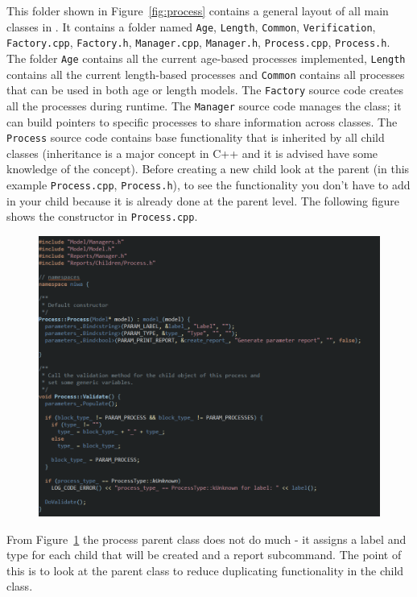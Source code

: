 This folder shown in Figure~\ref{fig:process} contains a general layout of all main classes in \CNAME. It contains a folder named \texttt{Age}, \texttt{Length}, \texttt{Common}, \texttt{Verification}, \texttt{Factory.cpp}, \texttt{Factory.h}, \texttt{Manager.cpp}, \texttt{Manager.h}, \texttt{Process.cpp}, \texttt{Process.h}. The folder \texttt{Age} contains all the current age-based processes implemented, \texttt{Length} contains all the current length-based processes and \texttt{Common} contains all processes that can be used in both age or length models. The \texttt{Factory} source code creates all the processes during runtime. The \texttt{Manager} source code manages the class; it can build pointers to specific processes to share information across classes. The \texttt{Process} source code contains base functionality that is inherited by all child classes (inheritance is a major concept in C++ and it is advised have some knowledge of the concept). Before creating a new child look at the parent (in this example \texttt{Process.cpp}, \texttt{Process.h}), to see the functionality you don't have to add in your child because it is already done at the parent level. The following figure shows the constructor in \texttt{Process.cpp}.
\clearpage
\begin{figure}[!ht]
	\centering
	\includegraphics[scale=0.6]{Figures/add_survival1.png}
	\caption{}\label{fig:process1}
\end{figure}

From Figure~\ref{fig:process1} the process parent class does not do much {\color{red}-} it assigns a label and type for each child that will be created and a report subcommand. The point of this is to look at the parent class to reduce duplicating functionality in the child class.

